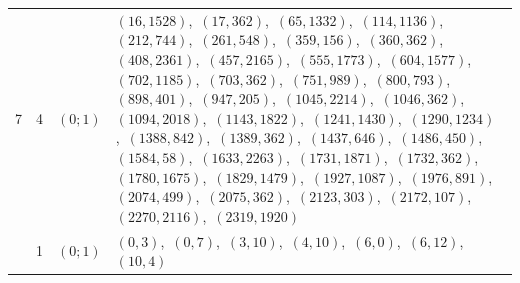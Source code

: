 \documentclass[11pt]{article}
\begin{document}
\begin{longtable}{@{}rrl>{\raggedright\arraybackslash}p{}@{}}
7 & 4 & $(0;1)$ & $(16,1528)$,\allowbreak\ $(17,362)$,\allowbreak\ $(65,1332)$,\allowbreak\ $(114,1136)$,\allowbreak\ $(212,744)$,\allowbreak\ $(261,548)$,\allowbreak\ $(359,156)$,\allowbreak\ $(360,362)$,\allowbreak\ $(408,2361)$,\allowbreak\ $(457,2165)$,\allowbreak\ $(555,1773)$,\allowbreak\ $(604,1577)$,\allowbreak\ $(702,1185)$,\allowbreak\ $(703,362)$,\allowbreak\ $(751,989)$,\allowbreak\ $(800,793)$,\allowbreak\ $(898,401)$,\allowbreak\ $(947,205)$,\allowbreak\ $(1045,2214)$,\allowbreak\ $(1046,362)$,\allowbreak\ $(1094,2018)$,\allowbreak\ $(1143,1822)$,\allowbreak\ $(1241,1430)$,\allowbreak\ $(1290,1234)$,\allowbreak\ $(1388,842)$,\allowbreak\ $(1389,362)$,\allowbreak\ $(1437,646)$,\allowbreak\ $(1486,450)$,\allowbreak\ $(1584,58)$,\allowbreak\ $(1633,2263)$,\allowbreak\ $(1731,1871)$,\allowbreak\ $(1732,362)$,\allowbreak\ $(1780,1675)$,\allowbreak\ $(1829,1479)$,\allowbreak\ $(1927,1087)$,\allowbreak\ $(1976,891)$,\allowbreak\ $(2074,499)$,\allowbreak\ $(2075,362)$,\allowbreak\ $(2123,303)$,\allowbreak\ $(2172,107)$,\allowbreak\ $(2270,2116)$,\allowbreak\ $(2319,1920)$\\
\addlinespace[3pt]
13 & 1 & $(0;1)$ & $(0,3)$,\allowbreak\ $(0,7)$,\allowbreak\ $(3,10)$,\allowbreak\ $(4,10)$,\allowbreak\ $(6,0)$,\allowbreak\ $(6,12)$,\allowbreak\ $(10,4)$\\

\end{longtable}
\end{document}
